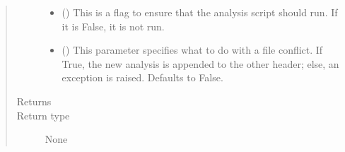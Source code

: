 \documentclass[letterpaper,10pt,english]{sphinxmanual}
\begin{document}
\begin{fulllineitems}
\begin{quote}
\begin{description}
\begin{itemize}
\item {} 
 () \textendash{} This is a flag to ensure that the analysis script should run.
If it is False, it is not run.

\item {} 
 (\sphinxstyleliteralemphasis{\sphinxupquote{ (}}\sphinxstyleliteralemphasis{\sphinxupquote{)}}) \textendash{} This parameter specifies what to do with a file conflict.
If True, the new analysis is appended to the other header;
else, an exception is raised. Defaults to False.

\end{itemize}

\item[{Returns}] \leavevmode


\item[{Return type}] \leavevmode
None

\end{description}\end{quote}

\end{fulllineitems}

\end{document}
